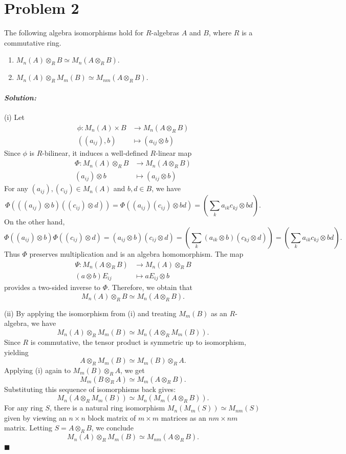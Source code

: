 \documentclass[12pt, a4paper]{article}
\theoremstyle{remark}
\newenvironment{solution}
  {\paragraph{\textit{Solution:}}\par\medskip}
  {\hfill$\blacksquare$\vspace{0.1cm}}
\begin{document}
\section*{Problem 2}
The following algebra isomorphisms hold for $R$-algebras $A$ and $B$, where $R$ is a commutative ring.
\begin{enumerate}
    \item[(i)] $M_n(A) \otimes_R B \simeq M_n(A \otimes_R B)$.
    \item[(ii)] $M_n(A) \otimes_R M_m(B) \simeq M_{nm}(A \otimes_R B)$.
\end{enumerate}
\begin{solution}
    (i) Let 
    \begin{align*}
        \phi : M_n(A) \times B &\to M_n(A \otimes_R B)\\
        ((a_{ij}), b)&\mapsto (a_{ij} \otimes b)
    \end{align*}
    Since $\phi$ is $R$-bilinear, it induces a well-defined $R$-linear map 
    \begin{align*}
        \Phi : M_n(A) \otimes_R B &\to M_n(A \otimes_R B)\\
        (a_{ij}) \otimes b &\mapsto (a_{ij} \otimes b)
    \end{align*}
    For any $(a_{ij}), (c_{ij}) \in M_n(A)$ and $b, d \in B$, we have$$\Phi(((a_{ij}) \otimes b)((c_{ij}) \otimes d)) = \Phi((a_{ij})(c_{ij}) \otimes bd) = \left(\sum_k a_{ik}c_{kj} \otimes bd\right).$$On the other hand,$$\Phi((a_{ij}) \otimes b)\Phi((c_{ij}) \otimes d) = (a_{ij} \otimes b)(c_{ij} \otimes d) = \left(\sum_k (a_{ik} \otimes b)(c_{kj} \otimes d)\right) = \left(\sum_k a_{ik}c_{kj} \otimes bd\right).$$Thus $\Phi$ preserves multiplication and is an algebra homomorphism. 
    The map 
    \begin{align*}
        \Psi: M_n(A \otimes_R B) &\to M_n(A) \otimes_R B \\
        (a \otimes b)E_{ij} &\mapsto aE_{ij} \otimes b
    \end{align*}
    provides a two-sided inverse to $\Phi$. Therefore, we obtain that $$M_n(A) \otimes_R B \simeq M_n(A \otimes_R B).$$
    
    (ii) By applying the isomorphism from (i) and treating $M_m(B)$ as an $R$-algebra, we have $$M_n(A) \otimes_R M_m(B) \simeq M_n(A \otimes_R M_m(B)).$$
     Since $R$ is commutative, the tensor product is symmetric up to isomorphism, yielding $$A \otimes_R M_m(B) \simeq M_m(B) \otimes_R A.$$ Applying (i) again to $M_m(B) \otimes_R A$, we get $$M_m(B \otimes_R A) \simeq M_m(A \otimes_R B).$$ Substituting this sequence of isomorphisms back gives:$$M_n(A \otimes_R M_m(B)) \simeq M_n(M_m(A \otimes_R B)).$$For any ring $S$, there is a natural ring isomorphism $M_n(M_m(S)) \simeq M_{nm}(S)$ given by viewing an $n \times n$ block matrix of $m \times m$ matrices as an $nm \times nm$ matrix. Letting $S = A \otimes_R B$, we conclude $$M_n(A) \otimes_R M_m(B) \simeq M_{nm}(A \otimes_R B).$$
\end{solution}
\end{document}
